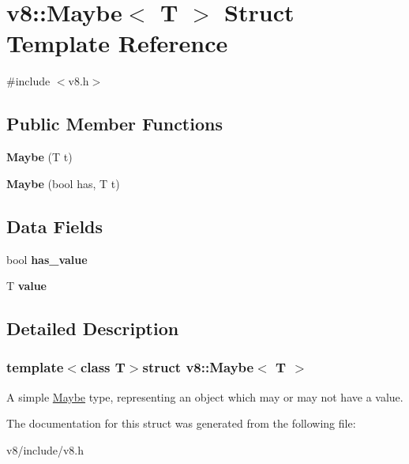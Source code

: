 \hypertarget{structv8_1_1Maybe}{}\section{v8\+:\+:Maybe$<$ T $>$ Struct Template Reference}
\label{structv8_1_1Maybe}


{\ttfamily \#include $<$v8.\+h$>$}

\subsection*{Public Member Functions}
\begin{DoxyCompactItemize}
\item 
\hypertarget{structv8_1_1Maybe_ae2281300d88d2d27681e28bc18535105}{}{\bfseries Maybe} (T t)\label{structv8_1_1Maybe_ae2281300d88d2d27681e28bc18535105}

\item 
\hypertarget{structv8_1_1Maybe_aef0c1b7d8dcab90514924e3e15e31a90}{}{\bfseries Maybe} (bool has, T t)\label{structv8_1_1Maybe_aef0c1b7d8dcab90514924e3e15e31a90}

\end{DoxyCompactItemize}
\subsection*{Data Fields}
\begin{DoxyCompactItemize}
\item 
\hypertarget{structv8_1_1Maybe_afd7a3ebca6d97a4b87f2829a28723b0b}{}bool {\bfseries has\+\_\+value}\label{structv8_1_1Maybe_afd7a3ebca6d97a4b87f2829a28723b0b}

\item 
\hypertarget{structv8_1_1Maybe_ac3e067a7ae1b5cc92c2f570499db31ea}{}T {\bfseries value}\label{structv8_1_1Maybe_ac3e067a7ae1b5cc92c2f570499db31ea}

\end{DoxyCompactItemize}


\subsection{Detailed Description}
\subsubsection*{template$<$class T$>$struct v8\+::\+Maybe$<$ T $>$}

A simple \hyperlink{structv8_1_1Maybe}{Maybe} type, representing an object which may or may not have a value. 

The documentation for this struct was generated from the following file\+:\begin{DoxyCompactItemize}
\item 
v8/include/v8.\+h\end{DoxyCompactItemize}

